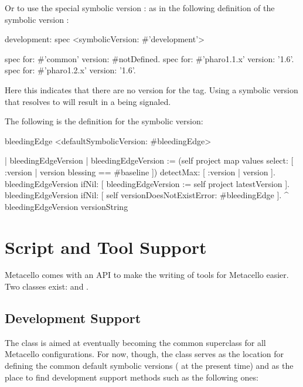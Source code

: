 \documentclass[a4paper,10pt,twoside]{book}
\begin{document}
Or to use the special symbolic version : as in the following definition of the symbolic version :

\begin{code}{}
development: spec
	<symbolicVersion: #'development'>

	spec for: #'common' version: #notDefined.
	spec for: #'pharo1.1.x' version: '1.6'.
	spec for: #'pharo1.2.x' version: '1.6'.
\end{code}

Here this indicates that there are no version for the  tag. 
Using a symbolic version that resolves to  will result in a  being signaled.

The following is the definition for the  symbolic version: 

\begin{code}{}
bleedingEdge
	<defaultSymbolicVersion: #bleedingEdge>

	| bleedingEdgeVersion |
	bleedingEdgeVersion := (self project map values select: [ :version |
version blessing == #baseline ])
		detectMax: [ :version | version ].
	bleedingEdgeVersion ifNil: [ bleedingEdgeVersion := self project
latestVersion ].
	bleedingEdgeVersion
		ifNil: [ self versionDoesNotExistError: #bleedingEdge ].
	^ bleedingEdgeVersion versionString
\end{code}



\section{Script and Tool Support}
Metacello comes with an API to make the writing of tools for Metacello easier. Two classes exist:  and . 

\subsection{Development Support}

The  class is aimed at eventually becoming the common superclass for all Metacello configurations. For now, though, the class serves as the location for defining the common default symbolic versions ( at the present time) and as the place to find development support methods such as the following ones:
\end{document}
